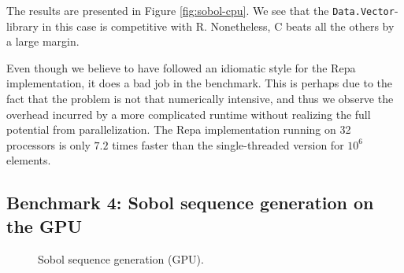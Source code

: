 The results are presented in Figure \ref{fig:sobol-cpu}. We see that
the \texttt{Data.Vector}-library in this case is competitive with
R. Nonetheless, C beats all the others by a large margin.

Even though we believe to have followed an idiomatic style for the
Repa implementation, it does a bad job in the benchmark. This is
perhaps due to the fact that the problem is not that numerically
intensive, and thus we observe the overhead incurred by a more
complicated runtime without realizing the full potential from
parallelization. The Repa implementation running on 32 processors is
only $7.2$ times faster than the single-threaded version for $10^6$
elements.

\subsection{Benchmark 4: Sobol sequence generation on the GPU}
\begin{figure}
	\centering
\begin{adjustbox}{minipage=1.3\textwidth,margin=0pt \smallskipamount,center}
\end{adjustbox}
  \caption{Sobol sequence generation (GPU).}
\label{fig:sobol-gpu}
\end{figure}

